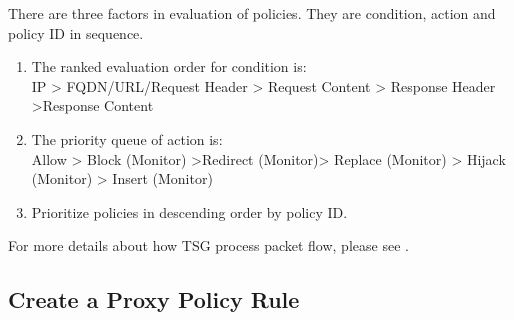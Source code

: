 There are three factors in evaluation of policies. They are condition, action and policy ID in sequence. 


\begin{description}[leftmargin=0pt]
    \item
    \begin{enumerate}
        \setlength{\topsep}{0pt} %
        \item The ranked evaluation order for condition is:\\
        IP > FQDN/URL/Request Header > Request Content > Response Header >Response Content
        \item The priority queue of action is:\\
        Allow > Block (Monitor) >Redirect (Monitor)> Replace (Monitor) > Hijack (Monitor) > Insert (Monitor) 
        \item Prioritize policies in descending order by policy ID.
    \end{enumerate}
\end{description}


For more details about how TSG process packet flow, please see \textbf{\hyperlink{link:Appendix E TSG Packet Flow}{\color{linkblue}{Appendix E TSG Packet Flow}}}.

\subsection*{\hypertarget{link:Create a Proxy Policy Rule}{Create a Proxy Policy Rule}}
\label{sec:policies:proxy:create}


